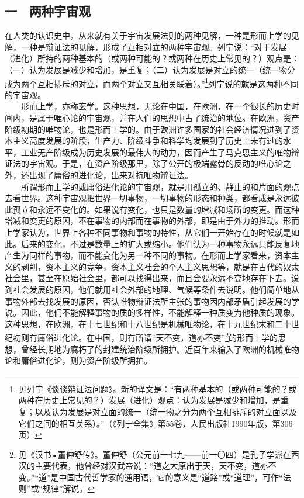 \documentclass[cn,11pt,chinese]{elegantbook}
\def\myformat#1{\hfil\hfil #1}
\begin{document}
\subsection*{\myformat{一　两种宇宙观}}
在人类的认识史中，从来就有关于宇宙发展法则的两种见解，一种是形而上学的见解，一种是辩证法的见解，形成了互相对立的两种宇宙观。列宁说：“对于发展（进化）所持的两种基本的（或两种可能的？或两种在历史上常见的？）观点是：（一）认为发展是减少和增加，是重复；（二）认为发展是对立的统一（统一物分成为两个互相排斥的对立，而两个对立又互相关联着）。”\footnote[4]{ 见列宁《谈谈辩证法问题》。新的译文是：“有两种基本的（或两种可能的？或两种在历史上常见的？）发展（进化）观点：认为发展是减少和增加，是重复；以及认为发展是对立面的统一（统一物之分为两个互相排斥的对立面以及它们之间的相互关系）。”（《列宁全集》第55卷，人民出版社1990年版，第306页）}列宁说的就是这两种不同的宇宙观。\\
　　形而上学，亦称玄学。这种思想，无论在中国，在欧洲，在一个很长的历史时间内，是属于唯心论的宇宙观，并在人们的思想中占了统治的地位。在欧洲，资产阶级初期的唯物论，也是形而上学的。由于欧洲许多国家的社会经济情况进到了资本主义高度发展的阶段，生产力、阶级斗争和科学均发展到了历史上未有过的水平，工业无产阶级成为历史发展的最伟大的动力，因而产生了马克思主义的唯物辩证法的宇宙观。于是，在资产阶级那里，除了公开的极端露骨的反动的唯心论之外，还出现了庸俗的进化论，出来对抗唯物辩证法。\\
　　所谓形而上学的或庸俗进化论的宇宙观，就是用孤立的、静止的和片面的观点去看世界。这种宇宙观把世界一切事物，一切事物的形态和种类，都看成是永远彼此孤立和永远不变化的。如果说有变化，也只是数量的增减和场所的变更。而这种增减和变更的原因，不在事物的内部而在事物的外部，即是由于外力的推动。形而上学家认为，世界上各种不同事物和事物的特性，从它们一开始存在的时候就是如此。后来的变化，不过是数量上的扩大或缩小。他们认为一种事物永远只能反复地产生为同样的事物，而不能变化为另一种不同的事物。在形而上学家看来，资本主义的剥削，资本主义的竞争，资本主义社会的个人主义思想等，就是在古代的奴隶社会里，甚至在原始社会里，都可以找得出来，而且会要永远不变地存在下去。说到社会发展的原因，他们就用社会外部的地理、气候等条件去说明。他们简单地从事物外部去找发展的原因，否认唯物辩证法所主张的事物因内部矛盾引起发展的学说。因此，他们不能解释事物的质的多样性，不能解释一种质变为他种质的现象。这种思想，在欧洲，在十七世纪和十八世纪是机械唯物论，在十九世纪末和二十世纪初则有庸俗进化论。在中国，则有所谓“天不变，道亦不变”\footnote[5]{ 见《汉书•董仲舒传》。董仲舒（公元前一七九——前一〇四）是孔子学派在西汉的主要代表，他曾经对汉武帝说：“道之大原出于天，天不变，道亦不变。”“道”是中国古代哲学家的通用语，它的意义是“道路”或“道理”，可作“法则”或“规律”解说。}的形而上学的思想，曾经长期地为腐朽了的封建统治阶级所拥护。近百年来输入了欧洲的机械唯物论和庸俗进化论，则为资产阶级所拥护。\\
\end{document}
